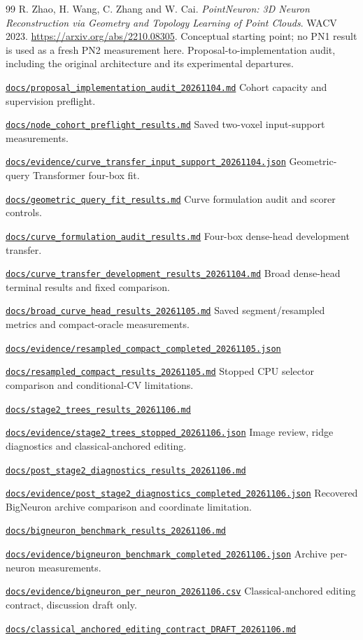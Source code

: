 \documentclass[11pt,a4paper]{article}
\newcommand{\sourcepath}[1]{\href{https://github.com/GraphiCortex/PointNeuron_Rec/blob/8c363d3cc3a9c7698d367aa93b9b5d0ce0f63103/#1}{\nolinkurl{#1}}}
\begin{document}
\begingroup\footnotesize
\begin{thebibliography}{99}
\setlength{\itemsep}{2pt}
\setlength{\parskip}{0pt}
 R. Zhao, H. Wang, C. Zhang and W. Cai. \emph{PointNeuron: 3D Neuron Reconstruction via Geometry and Topology Learning of Point Clouds}. WACV 2023. \url{https://arxiv.org/abs/2210.08305}. Conceptual starting point; no PN1 result is used as a fresh PN2 measurement here.
 Proposal-to-implementation audit, including the original architecture and its experimental departures.\par\sourcepath{docs/proposal_implementation_audit_20261104.md}
 Cohort capacity and supervision preflight.\par\sourcepath{docs/node_cohort_preflight_results.md}
 Saved two-voxel input-support measurements.\par\sourcepath{docs/evidence/curve_transfer_input_support_20261104.json}
 Geometric-query Transformer four-box fit.\par\sourcepath{docs/geometric_query_fit_results.md}
 Curve formulation audit and scorer controls.\par\sourcepath{docs/curve_formulation_audit_results.md}
 Four-box dense-head development transfer.\par\sourcepath{docs/curve_transfer_development_results_20261104.md}
 Broad dense-head terminal results and fixed comparison.\par\sourcepath{docs/broad_curve_head_results_20261105.md}
 Saved segment/resampled metrics and compact-oracle measurements.\par\sourcepath{docs/evidence/resampled_compact_completed_20261105.json}\par\sourcepath{docs/resampled_compact_results_20261105.md}
 Stopped CPU selector comparison and conditional-CV limitations.\par\sourcepath{docs/stage2_trees_results_20261106.md}\par\sourcepath{docs/evidence/stage2_trees_stopped_20261106.json}
 Image review, ridge diagnostics and classical-anchored editing.\par\sourcepath{docs/post_stage2_diagnostics_results_20261106.md}\par\sourcepath{docs/evidence/post_stage2_diagnostics_completed_20261106.json}
 Recovered BigNeuron archive comparison and coordinate limitation.\par\sourcepath{docs/bigneuron_benchmark_results_20261106.md}\par\sourcepath{docs/evidence/bigneuron_benchmark_completed_20261106.json}
 Archive per-neuron measurements.\par\sourcepath{docs/evidence/bigneuron_per_neuron_20261106.csv}
 Classical-anchored editing contract, discussion draft only.\par\sourcepath{docs/classical_anchored_editing_contract_DRAFT_20261106.md}
\end{thebibliography}
\endgroup
\end{document}

